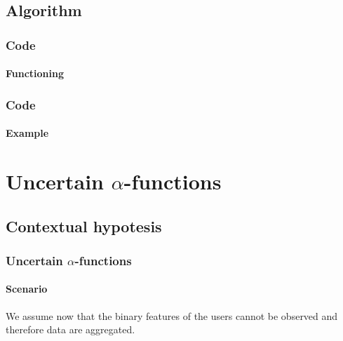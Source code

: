 \documentclass[11pt]{beamer}
\begin{document}
\subsection{Algorithm}


\begin{frame}

\frametitle{Code}
\framesubtitle{Functioning}


\end{frame}


\begin{frame}

\frametitle{Code}
\framesubtitle{Example}


\end{frame}


\AtBeginSection[]
{
\begin{frame}{}
    \tableofcontents[sections={\thesection}]
\end{frame}
}


\section{Uncertain $\alpha$-functions}


\subsection{Contextual hypotesis}


\begin{frame}

\frametitle{Uncertain $\alpha$-functions}
\framesubtitle{Scenario}

We assume now that the binary features of the users cannot be observed and therefore data are aggregated.

\end{frame}
\end{document}
